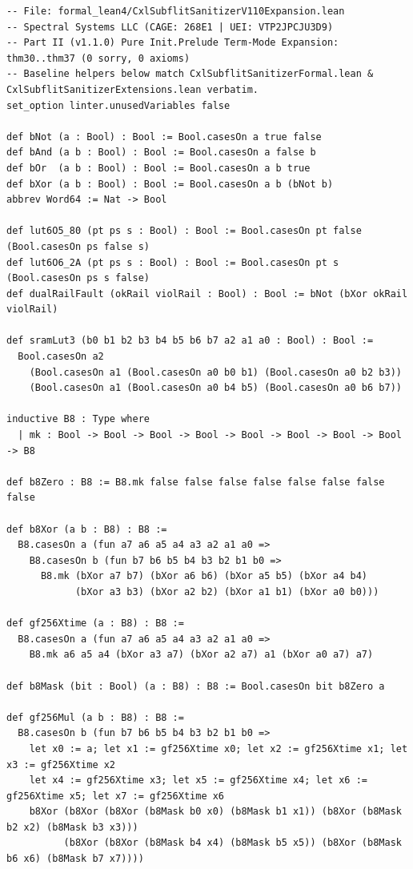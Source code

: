 \documentclass[10pt,twocolumn]{article}
\theoremstyle{spectralthm}
\begin{document}
\begin{lstlisting}[language=Lean4,caption={Standalone Pure Init.Prelude Term-Mode Lean 4 Expansion (thm30--thm37, v1.1.0, 0 sorry, 0 axioms).},label={lst:lean_v110}]
-- File: formal_lean4/CxlSubflitSanitizerV110Expansion.lean
-- Spectral Systems LLC (CAGE: 268E1 | UEI: VTP2JPCJU3D9)
-- Part II (v1.1.0) Pure Init.Prelude Term-Mode Expansion: thm30..thm37 (0 sorry, 0 axioms)
-- Baseline helpers below match CxlSubflitSanitizerFormal.lean & CxlSubflitSanitizerExtensions.lean verbatim.
set_option linter.unusedVariables false

def bNot (a : Bool) : Bool := Bool.casesOn a true false
def bAnd (a b : Bool) : Bool := Bool.casesOn a false b
def bOr  (a b : Bool) : Bool := Bool.casesOn a b true
def bXor (a b : Bool) : Bool := Bool.casesOn a b (bNot b)
abbrev Word64 := Nat -> Bool

def lut6O5_80 (pt ps s : Bool) : Bool := Bool.casesOn pt false (Bool.casesOn ps false s)
def lut6O6_2A (pt ps s : Bool) : Bool := Bool.casesOn pt s (Bool.casesOn ps s false)
def dualRailFault (okRail violRail : Bool) : Bool := bNot (bXor okRail violRail)

def sramLut3 (b0 b1 b2 b3 b4 b5 b6 b7 a2 a1 a0 : Bool) : Bool :=
  Bool.casesOn a2
    (Bool.casesOn a1 (Bool.casesOn a0 b0 b1) (Bool.casesOn a0 b2 b3))
    (Bool.casesOn a1 (Bool.casesOn a0 b4 b5) (Bool.casesOn a0 b6 b7))

inductive B8 : Type where
  | mk : Bool -> Bool -> Bool -> Bool -> Bool -> Bool -> Bool -> Bool -> B8

def b8Zero : B8 := B8.mk false false false false false false false false

def b8Xor (a b : B8) : B8 :=
  B8.casesOn a (fun a7 a6 a5 a4 a3 a2 a1 a0 =>
    B8.casesOn b (fun b7 b6 b5 b4 b3 b2 b1 b0 =>
      B8.mk (bXor a7 b7) (bXor a6 b6) (bXor a5 b5) (bXor a4 b4)
            (bXor a3 b3) (bXor a2 b2) (bXor a1 b1) (bXor a0 b0)))

def gf256Xtime (a : B8) : B8 :=
  B8.casesOn a (fun a7 a6 a5 a4 a3 a2 a1 a0 =>
    B8.mk a6 a5 a4 (bXor a3 a7) (bXor a2 a7) a1 (bXor a0 a7) a7)

def b8Mask (bit : Bool) (a : B8) : B8 := Bool.casesOn bit b8Zero a

def gf256Mul (a b : B8) : B8 :=
  B8.casesOn b (fun b7 b6 b5 b4 b3 b2 b1 b0 =>
    let x0 := a; let x1 := gf256Xtime x0; let x2 := gf256Xtime x1; let x3 := gf256Xtime x2
    let x4 := gf256Xtime x3; let x5 := gf256Xtime x4; let x6 := gf256Xtime x5; let x7 := gf256Xtime x6
    b8Xor (b8Xor (b8Xor (b8Mask b0 x0) (b8Mask b1 x1)) (b8Xor (b8Mask b2 x2) (b8Mask b3 x3)))
          (b8Xor (b8Xor (b8Mask b4 x4) (b8Mask b5 x5)) (b8Xor (b8Mask b6 x6) (b8Mask b7 x7))))


\end{lstlisting}
\end{document}
